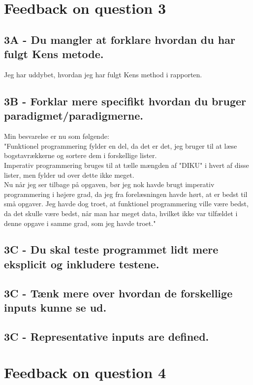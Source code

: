\documentclass[a4paper,12pt]{article}
\begin{document}
\section{Feedback on question 3}

\subsection*{3A - Du mangler at forklare hvordan du har fulgt Kens metode.}

Jeg har uddybet, hvordan jeg har fulgt Kens method i rapporten.

\subsection*{3B - Forklar mere specifikt hvordan du bruger paradigmet/paradigmerne.}

Min besvarelse er nu som følgende:\\
"Funktionel programmering fylder en del, da det er det, jeg bruger til at læse bogstavrækkerne og sortere dem i forskellige lister.\\
Imperativ programmering bruges til at tælle mængden af "DIKU" i hvert af disse lister, men fylder ud over dette ikke meget.\\
Nu når jeg ser tilbage på opgaven, bør jeg nok havde brugt imperativ programmering i højere grad, da jeg fra forelæsningen havde hørt, at er bedst til små opgaver. Jeg havde dog troet, at funktionel programmering ville være bedst, da det skulle være bedst, når man har meget data, hvilket ikke var tilfældet i denne opgave i samme grad, som jeg havde troet."


\subsection*{3C - Du skal teste programmet lidt mere eksplicit og inkludere testene.}


\subsection*{3C - Tænk mere over hvordan de forskellige inputs kunne se ud.}


\subsection*{3C - Representative inputs are defined.}


\section{Feedback on question 4}
\end{document}

